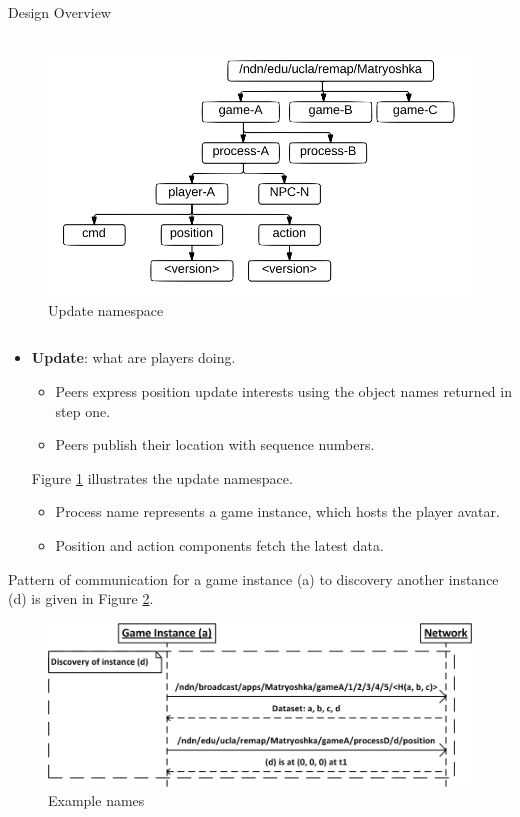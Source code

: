 \documentclass[final,hyperref={pdfpagelabels=false},20pt]{beamer}
\begin{document}
\begin{frame}[t]
\begin{columns}[t]
\begin{column}{.465\textwidth}
\begin{block}{Design Overview}
\begin{columns}
\begin{column}{.54\textwidth}
\begin{figure}
\includegraphics[width=\linewidth]{UpdateNamespace}
\caption{Update namespace}
\label{fig:updatenamespace}
\end{figure}
\end{column}
\end{columns}

\begin{column}{.01\textwidth}
\end{column}

\begin{itemize}
\item \textbf{Update}: what are players doing.
\begin{itemize}
\item Peers express position update interests using the object names returned in step one. 
\item Peers publish their location with sequence numbers.
\end{itemize}
Figure \ref{fig:updatenamespace} illustrates the update namespace.
\begin{itemize}
\item Process name represents a game instance, which hosts the player avatar.
\item Position and action components fetch the latest data.
\end{itemize}
\end{itemize}
Pattern of communication for a game instance (a) to discovery another instance (d) is given in Figure \ref{fig:samplenames}.
\begin{figure}
\includegraphics[width=0.66\linewidth]{SampleNames}
\caption{Example names}
\label{fig:samplenames}
\end{figure}


\end{block}
\end{column}
\end{columns}
\end{frame}
\end{document}
